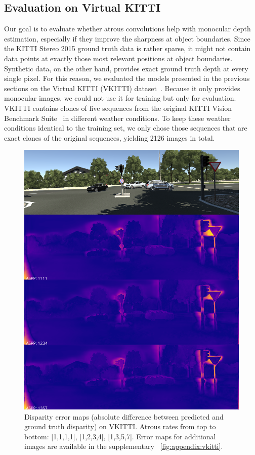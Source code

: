 \subsection{Evaluation on Virtual KITTI}\label{section:vkitti}
Our goal is to evaluate whether atrous convolutions help with monocular depth estimation, especially if they improve the sharpness at object boundaries. Since the KITTI Stereo 2015 ground truth data is rather sparse, it might not contain data points at exactly those most relevant positions at object boundaries. Synthetic data, on the other hand, provides exact ground truth depth at every single pixel. For this reason, we evaluated the models presented in the previous sections on the Virtual KITTI (VKITTI) dataset~\cite{Gaidon:Virtual:CVPR2016}. Because it only provides monocular images, we could not use it for training but only for evaluation. VKITTI contains clones of five sequences from the original KITTI Vision Benchmark Suite~\cite{geiger2012we} in different weather conditions. To keep these weather conditions identical to the training set, we only chose those sequences that are exact clones of the original sequences, yielding 2126 images in total.
\begin{figure}
    \centering
    \includegraphics[width=0.85\linewidth]{images/visual_comparisons/aspp-rates-vkitti/concat_383.png}
    \caption{Disparity error maps (absolute difference between predicted and ground truth disparity) on VKITTI. Atrous rates from top to bottom: [1,1,1,1], [1,2,3,4], [1,3,5,7]. Error maps for additional images are available in the supplementary \figurename~\ref{fig:appendix:vkitti}.}
    \label{fig:vkitti}
\end{figure}

